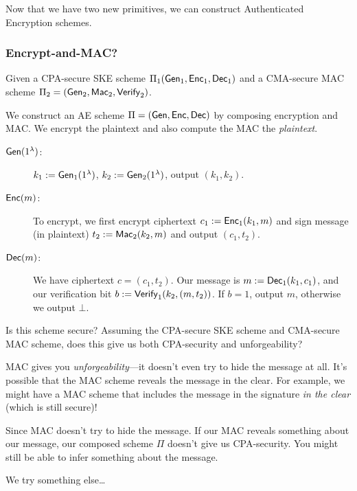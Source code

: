 
Now that we have two new primitives, we can construct Authenticated Encryption schemes.

\subsubsection{Encrypt-and-MAC?}
Given a CPA-secure SKE scheme $\Pi_1(\operatorname{\mathsf{Gen}}_1, \operatorname{\mathsf{Enc}}_1, \operatorname{\mathsf{Dec}}_1)$ and a CMA-secure MAC scheme $\Pi_2 = (\operatorname{\mathsf{Gen}}_2, \operatorname{\mathsf{Mac}}_2, \operatorname{\mathsf{Verify}}_2)$.

We construct an AE scheme $\Pi = (\operatorname{\mathsf{Gen}}, \operatorname{\mathsf{Enc}}, \operatorname{\mathsf{Dec}})$ by composing encryption and MAC. We encrypt the plaintext and also compute the MAC the \emph{plaintext}.


\begin{description}
    \item[$\operatorname{\mathsf{Gen}}(1^\lambda)$:] $k_1:=\operatorname{\mathsf{Gen}}_1(1^\lambda)$, $k_2:=\operatorname{\mathsf{Gen}}_2(1^\lambda)$, output $(k_1, k_2)$.

    \item[$\operatorname{\mathsf{Enc}}(m)$:] To encrypt, we first encrypt ciphertext $c_1 := \operatorname{\mathsf{Enc}}_1(k_1, m)$ and sign message (in plaintext) $t_2 := \operatorname{\mathsf{Mac}}_2(k_2, m)$ and output $(c_1, t_2)$.

    \item[$\operatorname{\mathsf{Dec}}(m)$:] We have ciphertext $c = (c_1, t_2)$. Our message is $m:=\operatorname{\mathsf{Dec}}_1(k_1, c_1)$, and our verification bit $b := \operatorname{\mathsf{Verify}}_1(k_2, (m, t_2))$. If $b = 1$, output $m$, otherwise we output $\bot$.
\end{description}

\begin{ques*}
    Is this scheme secure? Assuming the CPA-secure SKE scheme and CMA-secure MAC scheme, does this give us both CPA-security and unforgeability?
\end{ques*}

MAC gives you \emph{unforgeability}---it doesn't even try to hide the message at all. It's possible that the MAC scheme reveals the message in the clear. For example, we might have a MAC scheme that includes the message in the signature \emph{in the clear} (which is still secure)!

Since MAC doesn't try to hide the message. If our MAC reveals something about our message, our composed scheme $\Pi$ doesn't give us CPA-security. You might still be able to infer something about the message.

We try something else\dots

